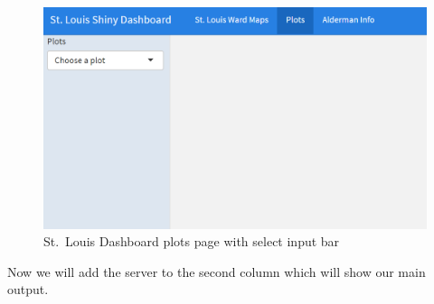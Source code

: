 \documentclass[
  krantz2]{krantz}
\begin{document}
\begin{figure}
\centering
\includegraphics{images/shiny_dashboard3.png}
\caption{St.~Louis Dashboard plots page with select input bar}
\end{figure}

Now we will add the server to the second column which will show our main output.
\end{document}
